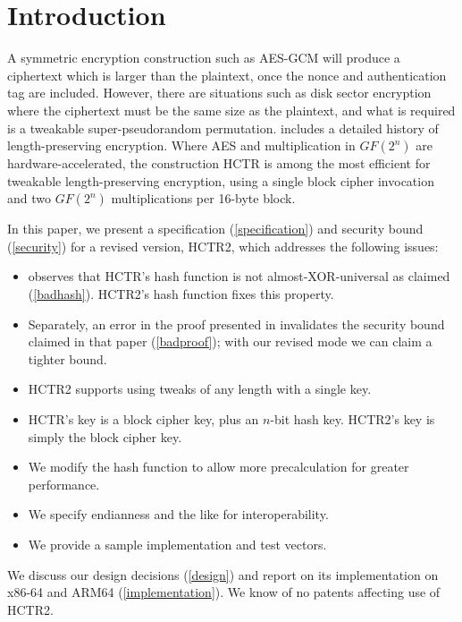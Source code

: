 \documentclass[hctr.tex]{subfiles}
\begin{document}
\section{Introduction}
A symmetric encryption construction such as AES-GCM\cite{gcm}
will produce a ciphertext which is larger than
the plaintext, once the nonce and authentication tag are included. However,
there are situations such as disk sector encryption
where the ciphertext must be the same size as the
plaintext, and what is required is a tweakable
super-pseudorandom permutation\cite{cmc}. 
\cite{adiantum} includes a detailed history of length-preserving encryption.
Where AES and multiplication in \(GF(2^n)\) are hardware-accelerated,
the construction HCTR\cite{hctr} is among the most efficient for 
tweakable length-preserving encryption, using
a single block cipher invocation and two \(GF(2^n)\) multiplications
per 16-byte block.

In this paper, we present 
a specification (\autoref{specification})
and security bound (\autoref{security})
for a revised version, HCTR2, which 
addresses the following issues:
\begin{itemize}
    \item \cite{kumarhctr} observes that HCTR's hash function
    is not almost-XOR-universal\cite{eadu} as claimed (\autoref{badhash}).
    HCTR2's hash function fixes this property.
    \item Separately,
    an error in the proof presented in \cite{hctrquad}
    invalidates the security bound claimed in that paper (\autoref{badproof}); with our revised
    mode we can claim a tighter bound.
    \item HCTR2 supports using tweaks of any length with a single key.
    \item HCTR's key is a block cipher key, plus an \(n\)-bit
    hash key. HCTR2's key is simply
    the block cipher key.
    \item We modify the hash function to allow more precalculation
    for greater performance.
    \item We specify endianness and the like for interoperability.
    \item We provide a sample implementation and test vectors.
\end{itemize}
We discuss our design decisions (\autoref{design})
and report on its implementation on x86-64 and ARM64 (\autoref{implementation}).
We know of no patents affecting use of HCTR2.
\end{document}
